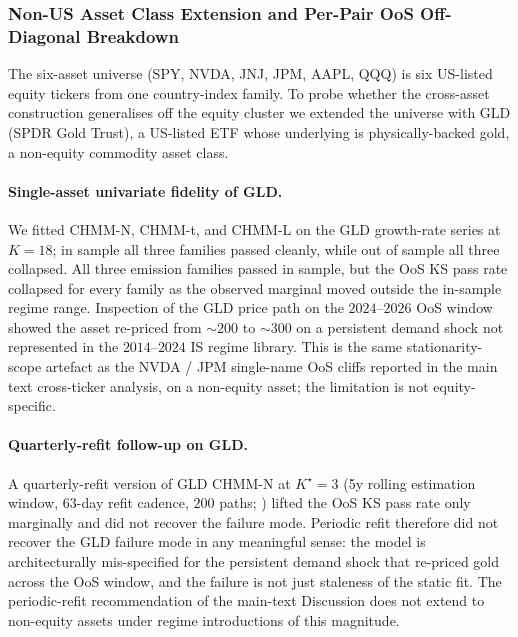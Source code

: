\subsubsection{Non-US Asset Class Extension and Per-Pair OoS Off-Diagonal Breakdown}
\label{sec:non_us_asset_supp}

The six-asset universe (SPY, NVDA, JNJ, JPM, AAPL, QQQ) is six US-listed equity tickers from one country-index family. To probe whether the cross-asset construction generalises off the equity cluster we extended the universe with GLD (SPDR Gold Trust), a US-listed ETF whose underlying is physically-backed gold, a non-equity commodity asset class.

\paragraph{Single-asset univariate fidelity of GLD.}
We fitted CHMM-N, CHMM-t, and CHMM-L on the GLD growth-rate series at $K = 18$; in sample all three families passed cleanly, while out of sample all three collapsed. All three emission families passed in sample, but the OoS KS pass rate collapsed for every family as the observed marginal moved outside the in-sample regime range. Inspection of the GLD price path on the $2024$--$2026$ OoS window showed the asset re-priced from $\sim 200$ to $\sim 300$ on a persistent demand shock not represented in the $2014$--$2024$ IS regime library. This is the same stationarity-scope artefact as the NVDA / JPM single-name OoS cliffs reported in the main text cross-ticker analysis, on a non-equity asset; the limitation is not equity-specific.

\paragraph{Quarterly-refit follow-up on GLD.}
A quarterly-refit version of GLD CHMM-N at $K^\star = 3$ (5y rolling estimation window, $63$-day refit cadence, $200$ paths; ) lifted the OoS KS pass rate only marginally and did not recover the failure mode. Periodic refit therefore did not recover the GLD failure mode in any meaningful sense: the model is architecturally mis-specified for the persistent demand shock that re-priced gold across the OoS window, and the failure is not just staleness of the static fit. The periodic-refit recommendation of the main-text Discussion does not extend to non-equity assets under regime introductions of this magnitude.


